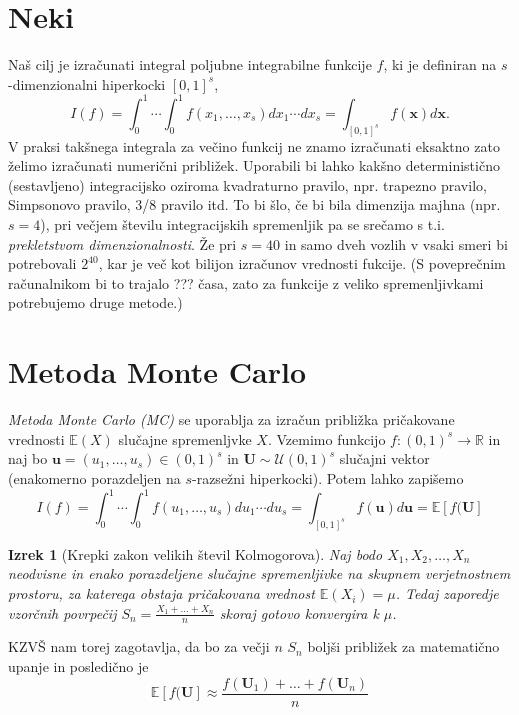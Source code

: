 \documentclass[12pt,a4paper, reqno]{amsart}
\theoremstyle{definition} %
\theoremstyle{plain} %
\newtheorem{izrek}[definicija]{Izrek}
\newcommand{\R}{\mathbb R}
\newcommand{\E}{\mathbb E}
\newcommand{\U}{\boldsymbol U}
\begin{document}
\section{Neki}
\vspace{3mm }
Naš cilj je izračunati integral poljubne integrabilne funkcije $f$, ki je definiran na $s$-dimenzionalni hiperkocki $[0,1]^s$,
\[I(f) = \int_{0}^{1}\cdots \int_{0}^{1}f(x_1,\ldots,x_s)dx_1\cdots dx_s = \int_{[0,1]^s} f(\boldsymbol x) d \boldsymbol x.
\]
V praksi takšnega integrala za večino funkcij ne znamo izračunati eksaktno zato želimo izračunati numerični približek. Uporabili bi lahko kakšno deterministično (sestavljeno) integracijsko oziroma kvadraturno pravilo, npr. trapezno pravilo, Simpsonovo pravilo, 3/8 pravilo itd. To bi šlo, če bi bila dimenzija majhna (npr. $s = 4$), pri večjem številu integracijskih spremenljik pa se srečamo s t.i. \textit{prekletstvom dimenzionalnosti}.
Že pri $s = 40$ in samo dveh vozlih v vsaki smeri bi potrebovali $2^{40}$, kar je več kot bilijon izračunov vrednosti fukcije. (S poveprečnim računalnikom bi to trajalo ??? časa, zato za funkcije z veliko spremenljivkami potrebujemo druge metode.)

\vspace{5mm}
\section{Metoda Monte Carlo}
\vspace{3mm}
\textit{Metoda Monte Carlo (MC)} se uporablja za izračun približka pričakovane vrednosti $\E(X)$ slučajne spremenljvke $X$. Vzemimo  funkcijo $f : (0,1)^s \rightarrow \R$ in naj bo $ \boldsymbol{u} = (u_1,\ldots,u_s) \in (0,1)^s$ in $\boldsymbol{U} \sim \mathcal{U}(0,1)^s$ slučajni vektor (enakomerno porazdeljen na $s$-razsežni hiperkocki). Potem lahko zapišemo 
\[I(f) = \int_{0}^{1}\cdots \int_{0}^{1}f(u_1,\ldots,u_s)du_1\cdots du_s = \int_{[0,1]^s} f(\boldsymbol u) d \boldsymbol u = \E[f(\boldsymbol U]
\]
\begin{izrek}[Krepki zakon velikih števil Kolmogorova]
Naj bodo $X_1,X_2,\ldots,X_n$ neodvisne in enako porazdeljene slučajne spremenljivke na skupnem verjetnostnem prostoru, za katerega obstaja pričakovana vrednost $\E(X_i) = \mu$. Tedaj zaporedje vzorčnih povrpečij $S_n = \frac{X_1 + \ldots + X_n}{n}$ skoraj gotovo konvergira k $\mu$.
\end{izrek}
KZVŠ nam torej zagotavlja, da bo za večji $n$ $S_n$ boljši približek za matematično upanje in posledično je 
\[
\E[f(\U] \approx \frac{f(\U_1) + \ldots+ f(\U_n)}{n}
\]
\vspace{2mm}
\end{document}
